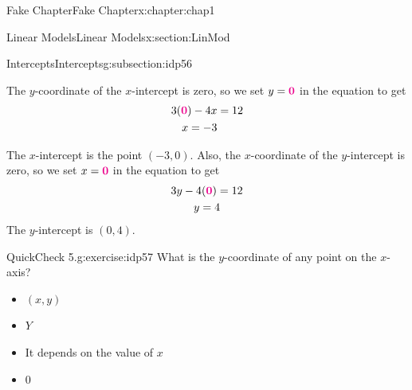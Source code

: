 \documentclass[oneside,10pt,]{book}
\numberwithin{equation}{section}
\newcommand{\alert}[1]{\boldsymbol{\color{magenta}{#1}}}
\newcommand{\amp}{&}
\begin{document}
\begin{chapterptx}{Fake Chapter}{}{Fake Chapter}{}{}{x:chapter:chap1}
\begin{sectionptx}{Linear Models}{}{Linear Models}{}{}{x:section:LinMod}
\begin{subsectionptx}{Intercepts}{}{Intercepts}{}{}{g:subsection:idp56}
\begin{sidebyside}{2}{0}{0}{0.05}
\end{sidebyside}%
\par
The \(y\)-coordinate of the \(x\)-intercept is zero, so we set \(y=\alert{0}\) in the equation to get%
\begin{align*}
3(\alert{0})-4x\amp=12\\
x=-3
\end{align*}
%
\par
The \(x\)-intercept is the point \((-3,0)\). Also, the \(x\)-coordinate of the \(y\)-intercept is zero, so we set \(x=\alert{0}\) in the equation to get%
\begin{gather*}
3y-4(\alert{0})=12\\
y=4
\end{gather*}
The \(y\)-intercept is \((0,4)\).%
\begin{inlineexercise}{QuickCheck 5.}{g:exercise:idp57}%
What is the \(y\)-coordinate of any point on the \(x\)-axis?%
\par
\begin{itemize}[label=$\odot$,leftmargin=3em,]
\item{}\(\displaystyle (x,y)\)%

\item{}\(\displaystyle Y\)%

\item{}It depends on the value of \(x\)%

\item{}0%


\end{itemize}
\end{inlineexercise}
\end{subsectionptx}
\end{sectionptx}
\end{chapterptx}
\end{document}
